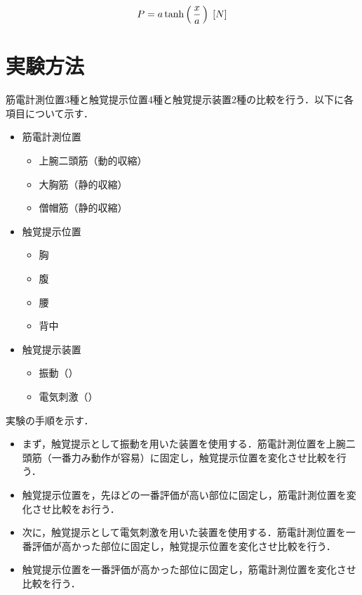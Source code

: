         \begin{eqnarray}
                \equlabel{haptics}
                P=a \tanh\left(\,\frac{x}{a}\,\right) \;[N]
        \end{eqnarray}
        
\section{実験方法}
        筋電計測位置3種と触覚提示位置4種と触覚提示装置2種の比較を行う．以下に各項目について示す．

        \begin{itemize}
        \item 筋電計測位置
                \begin{itemize}
                \item 上腕二頭筋（動的収縮）
                \item 大胸筋（静的収縮）
                \item 僧帽筋（静的収縮）
                \end{itemize}
        \item 触覚提示位置
                \begin{itemize}
                \item 胸
                \item 腹
                \item 腰
                \item 背中
                \end{itemize}
        \item 触覚提示装置
                \begin{itemize}
                \item 振動（）
                \item 電気刺激（）
                \end{itemize}
        \end{itemize}

        実験の手順を示す．
        \begin{itemize}
        \item まず，触覚提示として振動を用いた装置を使用する．筋電計測位置を上腕二頭筋（一番力み動作が容易）に固定し，触覚提示位置を変化させ比較を行う．
        \item 触覚提示位置を，先ほどの一番評価が高い部位に固定し，筋電計測位置を変化させ比較をお行う．
        \item 次に，触覚提示として電気刺激を用いた装置を使用する．筋電計測位置を一番評価が高かった部位に固定し，触覚提示位置を変化させ比較を行う．
        \item 触覚提示位置を一番評価が高かった部位に固定し，筋電計測位置を変化させ比較を行う．
        \end{itemize}


